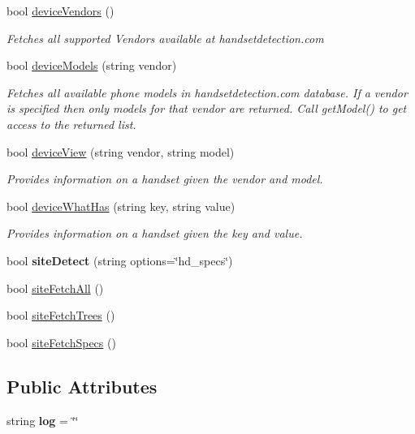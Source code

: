 \begin{DoxyCompactItemize}
\item 
bool \hyperlink{class_h_d3_1_1_h_d3_aa2f63450321e2f47b2cb3baf8ff1a5e8}{device\+Vendors} ()
\begin{DoxyCompactList}\small\item\em Fetches all supported Vendors available at handsetdetection.\+com\end{DoxyCompactList}\item 
bool \hyperlink{class_h_d3_1_1_h_d3_a5af669048eb1d372a703dd53b242fe2f}{device\+Models} (string vendor)
\begin{DoxyCompactList}\small\item\em Fetches all available phone models in handsetdetection.\+com database. If a vendor is specified then only models for that vendor are returned. Call get\+Model() to get access to the returned list. \end{DoxyCompactList}\item 
bool \hyperlink{class_h_d3_1_1_h_d3_aaba6d717a4579ca6fa7c5727e5d92333}{device\+View} (string vendor, string model)
\begin{DoxyCompactList}\small\item\em Provides information on a handset given the vendor and model. \end{DoxyCompactList}\item 
bool \hyperlink{class_h_d3_1_1_h_d3_a9640edbaf4dd41cd1c8bec9fa86f53a6}{device\+What\+Has} (string key, string value)
\begin{DoxyCompactList}\small\item\em Provides information on a handset given the key and value. \end{DoxyCompactList}\item 
\hypertarget{class_h_d3_1_1_h_d3_a094f2de65aed6b70560ae08c8fabfb2b}{bool {\bfseries site\+Detect} (string options=\char`\"{}hd\+\_\+specs\char`\"{})}\label{class_h_d3_1_1_h_d3_a094f2de65aed6b70560ae08c8fabfb2b}

\item 
bool \hyperlink{class_h_d3_1_1_h_d3_ad40ca41ce8ab43e23d9fec5d69eb59b5}{site\+Fetch\+All} ()
\item 
bool \hyperlink{class_h_d3_1_1_h_d3_ab7987ac1e6295533e55dcd5d300ae9cc}{site\+Fetch\+Trees} ()
\item 
bool \hyperlink{class_h_d3_1_1_h_d3_ae8d86be9f088829ebe42214cfb26672e}{site\+Fetch\+Specs} ()
\end{DoxyCompactItemize}
\subsection*{Public Attributes}
\begin{DoxyCompactItemize}
\item 
\hypertarget{class_h_d3_1_1_h_d3_af413d17666d552b40589ad290802f868}{string {\bfseries log} = \char`\"{}\char`\"{}}\label{class_h_d3_1_1_h_d3_af413d17666d552b40589ad290802f868}

\end{DoxyCompactItemize}
